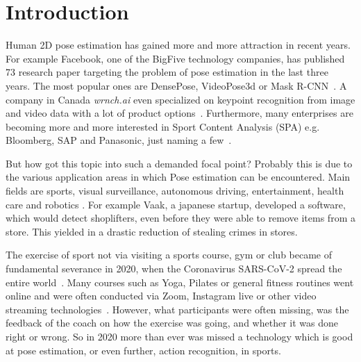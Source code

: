 


\chapter{Introduction} %

\label{introduction} %
\begin{flushleft}
    Human 2D pose estimation has gained more and more attraction in recent years.
    For example Facebook, one of the BigFive technology companies, has published 73 research paper targeting the
    problem of pose estimation in the last three years.
    The most popular ones are DensePose, VideoPose3d or Mask R-CNN~\cite{fbPub, DensePose, videopose3d, maskrcnn}.
    A company in Canada \textit{wrnch.ai} even specialized on keypoint recognition from image and video data with a
    lot of product options~\cite{wrnch}.
    Furthermore, many enterprises are becoming more and more interested in Sport Content Analysis (SPA)
    e.g. Bloomberg, SAP and Panasonic, just naming a few~\cite{sappanasonic, spaBloomberg}.
\end{flushleft}
\begin{flushleft}
    But how got this topic into such a demanded focal point?
    Probably this is due to the various application areas in which Pose estimation can be encountered.
    Main fields are sports, visual surveillance, autonomous driving, entertainment, health care and robotics
    \cite{olympicsport, surveillance, kinectWalkDepression}.
    For example Vaak, a japanese startup, developed a software, which would detect shoplifters,
    even before they were able to remove items from a store.
    This yielded in a drastic reduction of stealing crimes in stores.
\end{flushleft}
\begin{flushleft}
    The exercise of sport not via visiting a sports course, gym or club became of fundamental severance in 2020,
    when the Coronavirus SARS-CoV-2 spread the entire world~\cite{coronarki}.
    Many courses such as Yoga, Pilates or general fitness routines went online
    and were often conducted via Zoom, Instagram live or other video streaming technologies~\cite{coronalife}.
    However, what participants were often missing, was the feedback of the coach on how the exercise was going, and
    whether it was done right or wrong.
    So in 2020 more than ever was missed a technology which is good at pose estimation, or even further, action
    recognition, in sports.
\end{flushleft}

